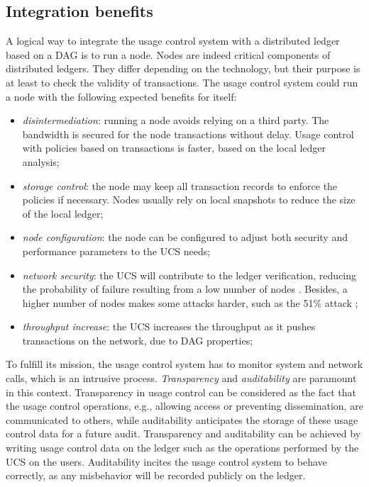 \subsection{Integration benefits}
\label{ss_integration_benefits}

A logical way to integrate the usage control system with a distributed ledger based on a DAG is to run a node. Nodes are indeed critical components of distributed ledgers. They differ depending on the technology, but their purpose is at least to check the validity of transactions. The usage control system could run a node with the following expected benefits for itself:

\begin{itemize}
    \item \emph{disintermediation}: running a node avoids relying on a third party. The bandwidth is secured for the node transactions without delay. Usage control with policies based on transactions is faster, based on the local ledger analysis;
    \item \emph{storage control}: the node may keep all transaction records to enforce the policies if necessary. Nodes usually rely on local snapshots to reduce the size of the local ledger;
    \item \emph{node configuration}: the node can be configured to adjust both security and performance parameters to the UCS needs;
    \item \emph{network security}: the UCS will contribute to the ledger verification, reducing the probability of failure resulting from a low number of nodes \cite{Khacef2021}. Besides, a higher number of nodes makes some attacks harder, such as the 51\% attack \cite{Aponte2021};
    \item \emph{throughput increase}: the UCS increases the throughput as it pushes transactions on the network, due to DAG properties;
\end{itemize}


To fulfill its mission, the usage control system has to monitor system and network calls, which is an intrusive process. \emph{Transparency} and \emph{auditability} are paramount in this context. 
Transparency in usage control can be considered as the fact that the usage control operations, e.g., allowing access or preventing dissemination, are communicated to others, while auditability anticipates the storage of these usage control data for a future audit. 
Transparency and auditability can be achieved by writing usage control data on the ledger such as the operations performed by the UCS on the users. Auditability incites the usage control system to behave correctly, as any misbehavior will be recorded publicly on the ledger. 

